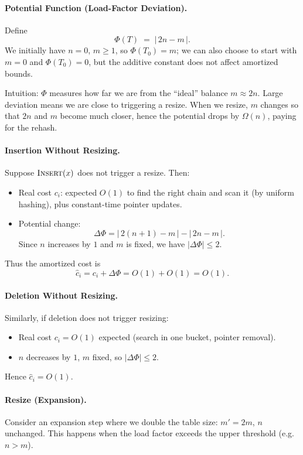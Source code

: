 \documentclass[9pt]{extarticle}
\begin{document}
\paragraph{Potential Function (Load-Factor Deviation).}
Define
\[
  \Phi(T) \;=\; |\,2n - m\,|.
\]
We initially have $n=0$, $m \ge 1$, so $\Phi(T_0) = m$;
we can also choose to start with $m=0$ and $\Phi(T_0)=0$,
but the additive constant does not affect amortized bounds.

Intuition: $\Phi$ measures how far we are from the ``ideal'' balance
$m \approx 2n$. Large deviation means we are close to triggering a resize.
When we resize, $m$ changes so that $2n$ and $m$ become much closer,
hence the potential drops by $\Omega(n)$, paying for the rehash.

\paragraph{Insertion Without Resizing.}
Suppose $\textsc{Insert}(x)$ does not trigger a resize. Then:

\begin{itemize}
  \item Real cost $c_i$:  
        expected $O(1)$ to find the right chain and scan it (by uniform hashing),
        plus constant-time pointer updates.
  \item Potential change:
        \[
          \Delta\Phi = |\,2(n+1) - m\,| - |\,2n - m\,|.
        \]
        Since $n$ increases by $1$ and $m$ is fixed, we have $|\Delta\Phi| \le 2$.
\end{itemize}
Thus the amortized cost is
\[
  \hat c_i = c_i + \Delta\Phi = O(1) + O(1) = O(1).
\]

\paragraph{Deletion Without Resizing.}
Similarly, if deletion does not trigger resizing:

\begin{itemize}
  \item Real cost $c_i = O(1)$ expected (search in one bucket, pointer removal).
  \item $n$ decreases by $1$, $m$ fixed, so $|\Delta\Phi| \le 2$.
\end{itemize}
Hence $\hat c_i = O(1)$.

\paragraph{Resize (Expansion).}
Consider an expansion step where we double the table size:
$m' = 2m$, $n$ unchanged.
This happens when the load factor exceeds the upper threshold
(e.g.\ $n > m$).
\end{document}
